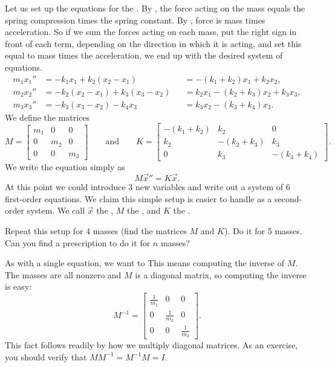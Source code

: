Let us set up the equations for the .
By , the force acting on the mass equals the 
spring compression times the spring constant.  By
,
force is mass times acceleration.  So if we sum the forces acting
on each mass, put the right sign in front of each term, depending on the
direction in which it is acting, and set this equal to mass
times the acceleration, we end up with the desired system of
equations.
\begin{equation*}
\begin{aligned}
m_1 x_1'' &= -k_1 x_1 + k_2 (x_2-x_1)
& & = -(k_1+k_2) x_1 + k_2 x_2 , \\
m_2 x_2'' &= -k_2 (x_2-x_1) + k_3 (x_3-x_2)
& & = k_2 x_1 -(k_2+k_3) x_2 + k_3 x_3 , \\
m_3 x_3'' &= -k_3 (x_3-x_2) - k_4 x_3
& & = k_3 x_2 - (k_3+k_4) x_3 . 
\end{aligned}
\end{equation*}
We define the matrices
\begin{equation*}
M =
\begin{bmatrix}
m_1 & 0 & 0 \\
0 & m_2 & 0 \\
0 & 0 & m_3
\end{bmatrix}
\qquad
\text{and}
\qquad
K =
\begin{bmatrix}
-(k_1+k_2) & k_2 & 0 \\
k_2 & -(k_2+k_3) & k_3 \\
0 & k_3 & -(k_3+k_4)
\end{bmatrix} .
\end{equation*}
We write the equation simply as
\begin{equation*}
M {\vec{x}}'' = K \vec{x} .
\end{equation*}
At this point we could introduce 3 new variables and write out a system
of 6 first-order equations.  We claim this simple setup is easier to handle as
a second-order system.
We call $\vec{x}$ the \emph{}, $M$ the
\emph{}, and $K$ the \emph{}.

\begin{exercise}
Repeat this setup for 4 masses (find the matrices $M$ and $K$).
Do it for 5 masses.  Can you
find a prescription to do it for $n$ masses?
\end{exercise}

As with a single equation, we want to   This means
computing the inverse of $M$.
The masses are all nonzero and $M$ is a
diagonal matrix, so computing the inverse
is easy:
\begin{equation*}
M^{-1} =
\begin{bmatrix}
\frac{1}{m_1} & 0 & 0 \\
0 & \frac{1}{m_2} & 0 \\
0 & 0 & \frac{1}{m_3}
\end{bmatrix} .
\end{equation*}
This fact follows readily
by how we multiply diagonal matrices.  As an exercise, you should verify that
$M M^{-1} = M^{-1} M = I$.


